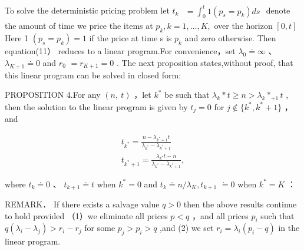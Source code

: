 To solve the deterministic pricing problem let \(t _ { k }\)
\(\begin{array} { r } { = \int _ { 0 } ^ { t } 1 \left( p _ { s } = p _ { k } \right) d s } \end{array}\)
denote the amount of time we price the items at
\(p _ { k } , k = 1 , \ldots , K ,\) over the horizon \([ 0 , t ]\) Here
1 \(( p _ { s } = p _ { k } ) = 1\) if the price at time s is
\(p _ { k }\) and zero otherwise. Then equation(11） reduces to a linear
program.For convenience，set \(\lambda _ { 0 } \doteq \infty\) 、
\(\lambda _ { K + 1 } \doteq 0\) and \(r _ { 0 }\)
\(= r _ { K + 1 } \dot { = } 0\) . The next proposition states,without
proof, that this linear program can be solved in closed form:

PROPOSITION 4.For any \(( n , \ t )\) ，let \(k ^ { * }\) be such that
\(\lambda _ { k } { * } t \geq n > \lambda _ { k } { * } _ { + 1 } t\) ,
then the solution to the linear program is given by \(t _ { j } = 0\)
for \(j \not \in \{ k ^ { * } , k ^ { * } + 1 \}\) ，and

\[
\begin{array} { c } { \displaystyle t _ { k ^ { * } } = \frac { n - \lambda _ { k ^ { * } + 1 } t } { \lambda _ { k ^ { * } } - \lambda _ { k ^ { * } + 1 } } } \\ { \displaystyle t _ { k ^ { * } + 1 } = \frac { \lambda _ { k ^ { * } } t - n } { \lambda _ { k ^ { * } } - \lambda _ { k ^ { * } + 1 } } , } \end{array}
\]

where \(t _ { k } \doteq 0\) 、 \(t _ { k + 1 } \doteq t\) when
\(k ^ { * } = 0\) and
\(t _ { k } \doteq n / \lambda _ { K } , t _ { k + 1 }\)
\(\dot { = } 0\) when \(k ^ { * } = K\) ：

REMARK． If there exists a salvage value \(q > 0\) then the above
results continue to hold provided （1）we eliminate all prices \(p < q\)
，and all prices \(p _ { i }\) such that
\(q ( \lambda _ { i } - \lambda _ { j } ) > r _ { i } - r _ { j }\) for
some \(p _ { j } > p _ { i } > q\) ,and (2) we set
\(r _ { i } = \lambda _ { i } ( p _ { i } - q )\) in the linear program.

